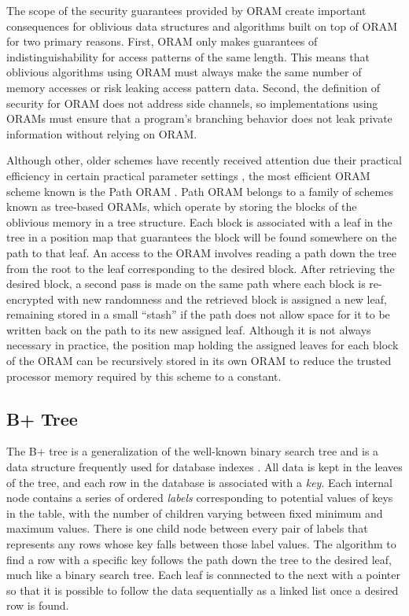 \documentclass[conference]{IEEEtran}
\begin{document}
The scope of the security guarantees provided by ORAM create important consequences for oblivious data structures and algorithms built on top of ORAM for two primary reasons. First, ORAM only makes guarantees of indistinguishability for access patterns of the same length. This means that oblivious algorithms using ORAM must always make the same number of memory accesses or risk leaking access pattern data. Second, the definition of security for ORAM does not address side channels, so implementations using ORAMs must ensure that a program's branching behavior does not leak private information without relying on ORAM.

Although other, older schemes have recently received attention due their practical efficiency in certain practical parameter settings \cite{ZWR+16}, the most efficient ORAM scheme known is the Path ORAM \cite{SDS+13}. Path ORAM belongs to a family of schemes known as tree-based ORAMs, which operate by storing the blocks of the oblivious memory in a tree structure. Each block is associated with a leaf in the tree in a position map that guarantees the block will be found somewhere on the path to that leaf. An access to the ORAM involves reading a path down the tree from the root to the leaf corresponding to the desired block. After retrieving the desired block, a second pass is made on the same path where each block is re-encrypted with new randomness and the retrieved block is assigned a new leaf, remaining stored in a small ``stash'' if the path does not allow space for it to be written back on the path to its new assigned leaf. Although it is not always necessary in practice, the position map holding the assigned leaves for each block of the ORAM can be recursively stored in its own ORAM to reduce the trusted processor memory required by this scheme to a constant.

\subsection{B+ Tree}

The B+ tree is a generalization of the well-known binary search tree and is a data structure frequently used for database indexes \cite{EN10, BPlus}. All data is kept in the leaves of the tree, and each row in the database is associated with a \textit{key}. Each internal node contains a series of ordered \textit{labels} corresponding to potential values of keys in the table, with the number of children varying between fixed minimum and maximum values. There is one child node between every pair of labels that represents any rows whose key falls between those label values. The algorithm to find a row with a specific key follows the path down the tree to the desired leaf, much like a binary search tree. Each leaf is connnected to the next with a pointer so that it is possible to follow the data sequentially as a linked list once a desired row is found. 
\end{document}
